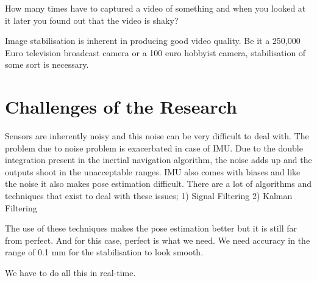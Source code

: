 How many times have to captured a video of something and when you looked at it later you found out that the video  is shaky? 

Image stabilisation is inherent in producing good video quality. Be it a 250,000 Euro television broadcast camera or a 100 euro hobbyist camera, stabilisation of some sort is necessary.


\section{Challenges of the Research}
Sensors are inherently noisy and this noise can be very difficult to deal with. The problem due to noise problem is exacerbated in case of IMU. Due to the double integration present in the inertial navigation algorithm, the noise adds up and the outputs shoot in the unacceptable ranges. IMU also comes with biases and like the noise it also makes pose estimation difficult. There are a lot of algorithms and techniques that exist to deal with these issues;
1) Signal Filtering
2) Kalman Filtering

The use of these techniques makes the pose estimation better but it is still far from perfect. And for this case, perfect is what we need. We need accuracy in the range of 0.1 mm for the stabilisation to look smooth.

We have to do all this in real-time.

